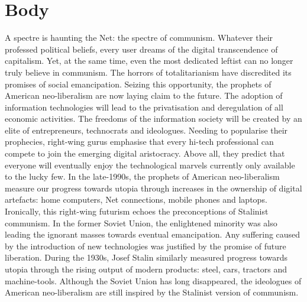 \documentclass[letterpaper,12pt,english]{sphinxmanual}
\begin{document}
\section{Body}
\label{cybercommunist:body}
A spectre is haunting the Net: the spectre of communism. Whatever their
professed political beliefs, every user dreams of the digital
transcendence of capitalism. Yet, at the same time, even the most
dedicated leftist can no longer truly believe in communism. The horrors
of totalitarianism have discredited its promises of social emancipation.
Seizing this opportunity, the prophets of American neo-liberalism are
now laying claim to the future. The adoption of information technologies
will lead to the privatisation and deregulation of all economic
activities. The freedoms of the information society will be created by
an elite of entrepreneurs, technocrats and ideologues. Needing to
popularise their prophecies, right-wing gurus emphasise that every
hi-tech professional can compete to join the emerging digital
aristocracy. Above all, they predict that everyone will eventually enjoy
the technological marvels currently only available to the lucky few. In
the late-1990s, the prophets of American neo-liberalism measure our
progress towards utopia through increases in the ownership of digital
artefacts: home computers, Net connections, mobile phones and laptops.
Ironically, this right-wing futurism echoes the preconceptions of
Stalinist communism. In the former Soviet Union, the enlightened
minority was also leading the ignorant masses towards eventual
emancipation. Any suffering caused by the introduction of new
technologies was justified by the promise of future liberation. During
the 1930s, Josef Stalin similarly measured progress towards utopia
through the rising output of modern products: steel, cars, tractors and
machine-tools. Although the Soviet Union has long disappeared, the
ideologues of American neo-liberalism are still inspired by the
Stalinist version of communism.
\end{document}
